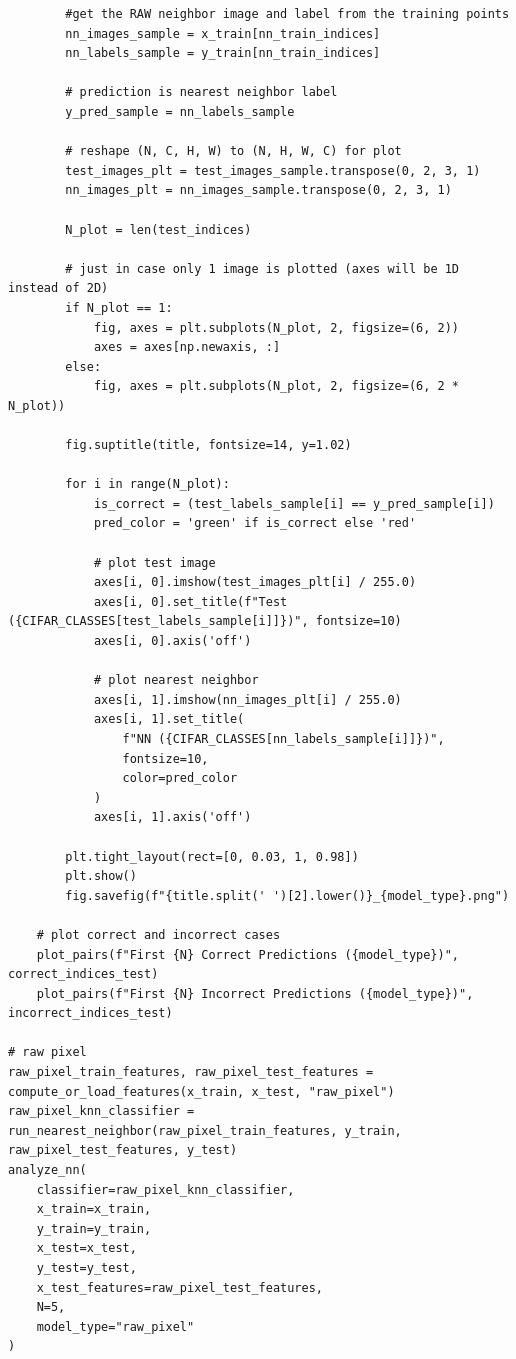 \documentclass{article}
\begin{document}
\begin{lstlisting}
        #get the RAW neighbor image and label from the training points
        nn_images_sample = x_train[nn_train_indices]
        nn_labels_sample = y_train[nn_train_indices]
        
        # prediction is nearest neighbor label
        y_pred_sample = nn_labels_sample
        
        # reshape (N, C, H, W) to (N, H, W, C) for plot
        test_images_plt = test_images_sample.transpose(0, 2, 3, 1)
        nn_images_plt = nn_images_sample.transpose(0, 2, 3, 1)

        N_plot = len(test_indices)
        
        # just in case only 1 image is plotted (axes will be 1D instead of 2D)
        if N_plot == 1:
            fig, axes = plt.subplots(N_plot, 2, figsize=(6, 2))
            axes = axes[np.newaxis, :] 
        else:
            fig, axes = plt.subplots(N_plot, 2, figsize=(6, 2 * N_plot))
            
        fig.suptitle(title, fontsize=14, y=1.02)
        
        for i in range(N_plot):
            is_correct = (test_labels_sample[i] == y_pred_sample[i])
            pred_color = 'green' if is_correct else 'red'
            
            # plot test image
            axes[i, 0].imshow(test_images_plt[i] / 255.0)
            axes[i, 0].set_title(f"Test ({CIFAR_CLASSES[test_labels_sample[i]]})", fontsize=10)
            axes[i, 0].axis('off')
            
            # plot nearest neighbor
            axes[i, 1].imshow(nn_images_plt[i] / 255.0)
            axes[i, 1].set_title(
                f"NN ({CIFAR_CLASSES[nn_labels_sample[i]]})", 
                fontsize=10, 
                color=pred_color
            )
            axes[i, 1].axis('off')
        
        plt.tight_layout(rect=[0, 0.03, 1, 0.98])
        plt.show()
        fig.savefig(f"{title.split(' ')[2].lower()}_{model_type}.png")

    # plot correct and incorrect cases
    plot_pairs(f"First {N} Correct Predictions ({model_type})", correct_indices_test)
    plot_pairs(f"First {N} Incorrect Predictions ({model_type})", incorrect_indices_test)

# raw pixel 
raw_pixel_train_features, raw_pixel_test_features = compute_or_load_features(x_train, x_test, "raw_pixel")
raw_pixel_knn_classifier = run_nearest_neighbor(raw_pixel_train_features, y_train, raw_pixel_test_features, y_test)
analyze_nn(
    classifier=raw_pixel_knn_classifier,
    x_train=x_train,  
    y_train=y_train,
    x_test=x_test,    
    y_test=y_test,
    x_test_features=raw_pixel_test_features, 
    N=5,
    model_type="raw_pixel"
)


\end{lstlisting}
\end{document}
